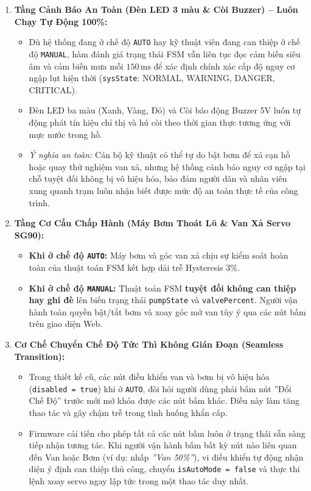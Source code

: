 \begin{enumerate}
    \item \textbf{Tầng Cảnh Báo An Toàn (Đèn LED 3 màu \& Còi Buzzer) -- Luôn Chạy Tự Động 100\%:}
    \begin{itemize}
        \item Dù hệ thống đang ở chế độ \texttt{AUTO} hay kỹ thuật viên đang can thiệp ở chế độ \texttt{MANUAL}, hàm đánh giá trạng thái FSM vẫn liên tục đọc cảm biến siêu âm và cảm biến mưa mỗi $150\,\text{ms}$ để xác định chính xác cấp độ nguy cơ ngập lụt hiện thời (\texttt{sysState}: NORMAL, WARNING, DANGER, CRITICAL).
        \item Đèn LED ba màu (Xanh, Vàng, Đỏ) và Còi báo động Buzzer 5V luôn tự động phát tín hiệu chỉ thị và hú còi theo thời gian thực tương ứng với mực nước trong hồ.
        \item \textit{Ý nghĩa an toàn:} Cán bộ kỹ thuật có thể tự do bật bơm để xả cạn hồ hoặc quay thử nghiệm van xả, nhưng hệ thống cảnh báo nguy cơ ngập tại chỗ tuyệt đối không bị vô hiệu hóa, bảo đảm người dân và nhân viên xung quanh trạm luôn nhận biết được mức độ an toàn thực tế của công trình.
    \end{itemize}

    \item \textbf{Tầng Cơ Cấu Chấp Hành (Máy Bơm Thoát Lũ \& Van Xả Servo SG90):}
    \begin{itemize}
        \item \textbf{Khi ở chế độ \texttt{AUTO}:} Máy bơm và góc van xả chịu sự kiểm soát hoàn toàn của thuật toán FSM kết hợp dải trễ Hysteresis $3\%$.
        \item \textbf{Khi ở chế độ \texttt{MANUAL}:} Thuật toán FSM \textbf{tuyệt đối không can thiệp hay ghi đè} lên biến trạng thái \lstinline|pumpState| và \lstinline|valvePercent|. Người vận hành toàn quyền bật/tắt bơm và xoay góc mở van tùy ý qua các nút bấm trên giao diện Web.
    \end{itemize}

    \item \textbf{Cơ Chế Chuyển Chế Độ Tức Thì Không Gián Đoạn (Seamless Transition):}
    \begin{itemize}
        \item Trong thiết kế cũ, các nút điều khiển van và bơm bị vô hiệu hóa (\texttt{disabled = true}) khi ở \texttt{AUTO}, đòi hỏi người dùng phải bấm nút ''Đổi Chế Độ'' trước mới mở khóa được các nút bấm khác. Điều này làm tăng thao tác và gây chậm trễ trong tình huống khẩn cấp.
        \item Firmware cải tiến cho phép tất cả các nút bấm luôn ở trạng thái sẵn sàng tiếp nhận tương tác. Khi người vận hành bấm bất kỳ nút nào liên quan đến Van hoặc Bơm (ví dụ: nhấp \textit{''Van 50\%''}), vi điều khiển tự động nhận diện ý định can thiệp thủ công, chuyển \lstinline|isAutoMode = false| và thực thi lệnh xoay servo ngay lập tức trong một thao tác duy nhất.
    \end{itemize}


\end{enumerate}
